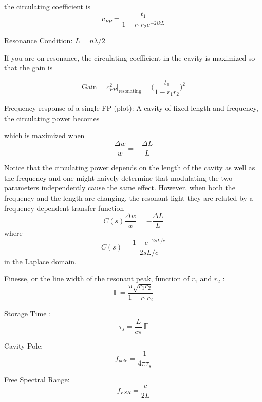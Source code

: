\documentclass[oneside]{book}
\begin{document}
		the circulating coefficient is
		\begin{equation}
		c_{FP} = \frac{t_1}{1- r_1 r_2 e^{-2ikL}}
		\end{equation}
		
		Resonance Condition: $L = n \lambda / 2$  
		
		If you are on resonance, the circulating coefficient in the cavity is maximized so that the gain is
		
		\begin{equation}
		\text{Gain} = c^2_{FP} \vert_{\text{resonating}} = \bigg( \frac{t_1}{1-r_1 r_2}\bigg)^2
		\end{equation}
		
		Frequency response of a single FP (plot):
		\cite{Lawrence:99}
		A cavity of fixed length and frequency, the circulating power becomes
	
		which is maximized when 
		\begin{equation}
		\frac{\Delta w}{w} = -\frac{\Delta L}{L}
		\end{equation}
		
		Notice that the circulating power depends on the length of the cavity as well as the frequency and one might naively determine that modulating the two parameters independently cause the same effect.  However, when both the frequency and the length are changing, the resonant light  they are related by a frequency dependent transfer function
		\begin{equation}
		C(s) \frac{\Delta w}{w} = -\frac{\Delta L}{L}
		\end{equation}
		where
		\begin{equation}
		C(s) = \frac{1-e^{-2sL/c}}{2sL/c}
		\end{equation}
		in the Laplace domain.
		
		Finesse, or the line width of the resonant peak, function of $r_1$ and $r_2$      :
		\begin{equation}
		\mathbb{F} = \frac{\pi \sqrt{r_1 r_2}}{1- r_1 r_2}
		\end{equation}
		
		Storage Time :
		\begin{equation}
		\tau_{s} = \frac{L}{c \pi} \, \mathbb{F}
		\end{equation}
		
		Cavity Pole:
		\begin{equation}
		f_{pole} = \frac{1}{4\pi \tau_{s}}
		\end{equation}
	
		Free Spectral Range:
		\begin{equation}
		f_{FSR}  = \frac{c}{2L}
		\end{equation}
		
\end{document}
